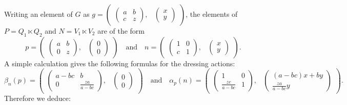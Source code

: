 \documentclass[a4paper,11pt,reqno]{amsart}
\numberwithin{equation}{section}
\theoremstyle{remark}
\theoremstyle{definition}
\begin{document}
Writing an element of $ G$ as
$g=\begin{pmatrix} \begin{pmatrix}a&b\\c&z\end{pmatrix},&\!\!\!\!\begin{pmatrix}x\\y\end{pmatrix}\end{pmatrix}$, the elements of $P=Q_1\ltimes Q_2$ and
$N=V_1\ltimes V_2$ are of the form
$$
p=\begin{pmatrix} \begin{pmatrix}a&b\\0&z\end{pmatrix},&\!\!\!\!\begin{pmatrix}0\\0\end{pmatrix}\end{pmatrix}\quad\mbox{and}\quad
n=\begin{pmatrix} \begin{pmatrix}1&0\\c&1\end{pmatrix},&\!\!\!\!\begin{pmatrix}x\\y\end{pmatrix}\end{pmatrix}.
$$
A simple calculation gives the following formulas for the dressing actions:
$$
\beta_n(p)=\begin{pmatrix} \begin{pmatrix}a-bc&b\\0&\frac{za}{a-bc}\end{pmatrix},&\!\!\!\!\begin{pmatrix}0\\0\end{pmatrix}\end{pmatrix}
\quad\mbox{and}\quad
\alpha_p(n)=\begin{pmatrix} \begin{pmatrix}1&0\\\frac{zc}{a-bc}&1\end{pmatrix},&\!\!\!\!\begin{pmatrix}(a-bc)x+by\\ \frac{za}{a-bc}y\end{pmatrix}\end{pmatrix}.
$$
Therefore we deduce:
\end{document}
